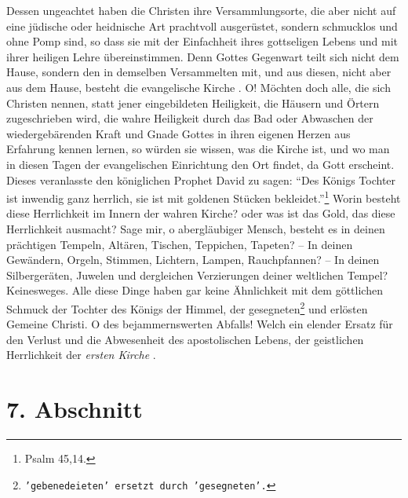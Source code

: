 \medskip

Dessen ungeachtet haben die Christen ihre Versammlungsorte, die aber nicht auf
eine jüdische oder heidnische Art prachtvoll ausgerüstet, sondern schmucklos und
ohne Pomp sind, so dass sie mit der Einfachheit ihres gottseligen Lebens und mit
ihrer heiligen Lehre übereinstimmen. Denn Gottes Gegenwart 
teilt sich nicht dem
Hause, sondern den in demselben Versammelten mit, und aus diesen, nicht aber aus
dem Hause, besteht die evangelische Kirche 
. O! Möchten doch alle, die sich
Christen nennen, statt jener eingebildeten Heiligkeit, die Häusern und Örtern
zugeschrieben wird, die wahre Heiligkeit durch das Bad oder Abwaschen der
wiedergebärenden Kraft und Gnade Gottes in ihren eigenen Herzen aus Erfahrung
kennen lernen, so würden sie wissen, was die Kirche ist, und wo man in diesen
Tagen der evangelischen Einrichtung den Ort findet, da Gott erscheint. Dieses
veranlasste den königlichen Prophet David  zu sagen:
"`Des Königs Tochter ist inwendig ganz herrlich, sie ist mit goldenen Stücken
bekleidet."'\footnote{Psalm 45,14.}
Worin besteht diese Herrlichkeit im Innern der wahren Kirche?
oder was
ist das Gold, das diese Herrlichkeit ausmacht? Sage mir, o abergläubiger Mensch,
besteht es in deinen prächtigen Tempeln, Altären, Tischen,
Teppichen, Tapeten?
-- In deinen Gewändern, Orgeln, Stimmen, Lichtern, Lampen,
Rauchpfannen? -- In
deinen Silbergeräten, Juwelen und dergleichen Verzierungen deiner weltlichen
Tempel? Keinesweges. Alle diese Dinge haben gar keine
Ähnlichkeit mit dem
göttlichen Schmuck der Tochter des Königs der Himmel, der
gesegneten\footnote{\texttt{'gebenedeieten' ersetzt durch 'gesegneten'.}}
und
erlösten Gemeine Christi. O des bejammernswerten Abfalls! Welch ein elender
Ersatz für den Verlust und die Abwesenheit des apostolischen Lebens, der
geistlichen Herrlichkeit der \textit{ersten Kirche} .

\section{7. Abschnitt} \label{kap5_ab7}

